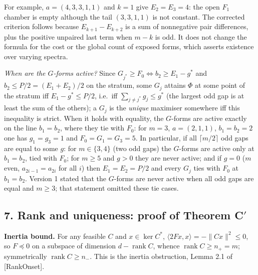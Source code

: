 \documentclass[
  11pt,
  a4paper,
]{article}
\begin{document}
For example, \(a=(4,\allowbreak{}3,\allowbreak{}3,\allowbreak{}1,\allowbreak{}1)\) and \(k=1\) give \(E_2=E_3=4\): the open
\(F_1\) chamber is empty although the tail \((3,\allowbreak{}3,\allowbreak{}1,\allowbreak{}1)\) is not
constant. The corrected criterion follows because \(E_{k+1}-E_{k+2}\) is
a sum of nonnegative pair differences, plus the positive unpaired last
term when \(m-k\) is odd. It does not change the formula for the cost or
the global count of exposed forms, which asserts existence over varying
spectra.

\emph{When are the \(G\)-forms active?} Since
\(G_{j^*}\ge F_0\iff b_2\ge E_1-g^*\) and \(b_2\le P/2=(E_1+E_2)/2\) on
the stratum, some \(G_j\) attains \(\Phi\) at some point of the stratum
iff \(E_1-g^*\le P/2\), i.e.~iff \(\sum_{j\ne j^*}g_j\le g^*\) (the
largest odd gap is at least the sum of the others); a \(G_j\) is the
\emph{unique} maximiser somewhere iff this inequality is strict. When it
holds with equality, the \(G\)-forms are active exactly on the line
\(b_1=b_2\), where they tie with \(F_0\): for \(m=3\), \(a=(2,\allowbreak{}1,\allowbreak{}1)\),
\(b_1=b_2=2\) one has \(g_1=g_3=1\) and \(F_0=G_1=G_3=5\). In
particular, if all \(\lceil m/2\rceil\) odd gaps are equal to some
\(g\): for \(m\in\{3,\allowbreak{}4\}\) (two odd gaps) the \(G\)-forms are active
only at \(b_1=b_2\), tied with \(F_0\); for \(m\ge5\) and \(g>0\) they
are never active; and if \(g=0\) (\(m\) even, \(a_{2i-1}=a_{2i}\) for
all \(i\)) then \(E_1=E_2=P/2\) and every \(G_j\) ties with \(F_0\) at
\(b_1=b_2\). Version 1 stated that the \(G\)-forms are never active when
all odd gaps are equal and \(m\ge3\); that statement omitted these tie
cases.

\subsection{\texorpdfstring{7. Rank and uniqueness: proof of Theorem
C\('\)}{7. Rank and uniqueness: proof of Theorem C\textquotesingle{}}}\label{rank-and-uniqueness-proof-of-theorem-c}

\textbf{Inertia bound.} For any feasible \(C\) and \(x\in\ker C^*\),
\(\langle 2Fx,\allowbreak{}x\rangle=-\|Cx\|^2\le0\), so \(F\preceq0\) on a subspace
of dimension \(d-\operatorname{rank}C\), whence
\(\operatorname{rank}C\ge n_+=m\); symmetrically
\(\operatorname{rank}C\ge n_-\). This is the inertia obstruction, Lemma
2.1 of {[}RankOnset{]}.
\end{document}
